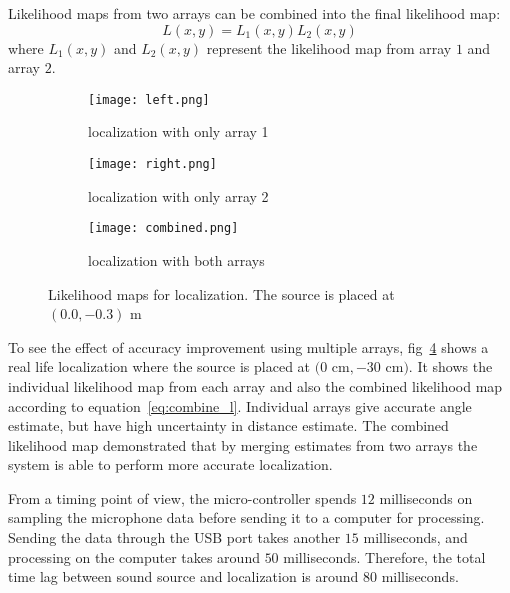 Likelihood maps from two arrays can be combined into the final likelihood map:
\begin{equation}\label{eq:combine_l}
L(x,y) = L_1(x,y) L_2(x,y)
\end{equation}
where $L_1(x,y)$ and $L_2(x,y)$ represent the likelihood map from array $1$ and array $2$.

\begin{figure}[]
  \centering
  \begin{subfigure}[]{.33\textwidth}
    \texttt{[image: left.png]}
    \caption{localization with only array 1}
    \label{fig:liklihood1}
  \end{subfigure}
  \begin{subfigure}[]{.33\textwidth}
    \texttt{[image: right.png]}
    \caption{localization with only array 2}
    \label{fig:liklihood2}
  \end{subfigure}
  \begin{subfigure}[]{.33\textwidth}
    \texttt{[image: combined.png]}
    \caption{localization with both arrays}
    \label{fig:liklihood3}
  \end{subfigure}
  \caption{Likelihood maps for localization. The source is placed at $(0.0,-0.3)$ m}
  \label{fig:liklihood}
\end{figure}

To see the effect of accuracy improvement using multiple arrays, fig~\ref{fig:liklihood} shows a real life localization where the source is placed at $(0$ cm$,-30$ cm$)$. It shows the individual likelihood map from each array and also the combined likelihood map according to equation~\ref{eq:combine_l}. Individual arrays give accurate angle estimate, but have high uncertainty in distance estimate. The combined likelihood map demonstrated that by merging estimates from two arrays the system is able to perform more accurate localization. 

From a timing point of view, the micro-controller spends $12$ milliseconds on sampling the microphone data before sending it to a computer for processing. Sending the data through the USB port takes another $15$ milliseconds, and processing on the computer takes around $50$ milliseconds. Therefore, the total time lag between sound source and localization is around $80$ milliseconds.
